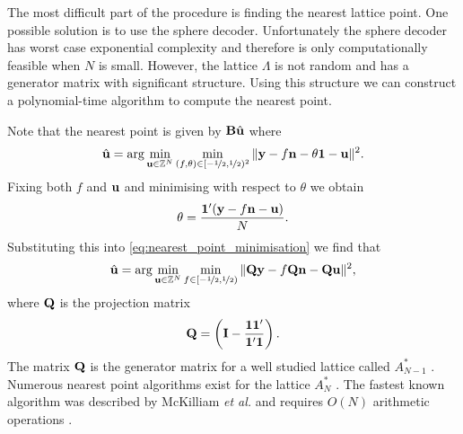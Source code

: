 The most difficult part of the procedure is finding the nearest lattice point.
One possible solution is to use the sphere decoder.  Unfortunately the sphere
decoder has worst case exponential complexity and therefore is only
computationally feasible when $N$ is small.  However, the lattice $\Lambda$ is
not random and has a generator matrix with significant structure.  Using this
structure we can construct a polynomial-time algorithm to compute the nearest
point.  %

Note that the nearest point is given by $\mathbf{B}\hat{\mathbf{u}}$ where
\begin{equation}\label{eq:nearest_point_minimisation}
\hat{\ubf} = \arg\min_{\ubf\in\ints^N}\min_{(f, \theta)\in[-\nicefrac{1}{2},\nicefrac{1}{2})^2} \|\ybf - f\nbf - \theta\onebf - \ubf\|^2 .
\end{equation}
Fixing both $f$ and $\mathbf{u}$ and minimising with respect to $\theta$ we obtain
\begin{equation} \label{eq:minwrttheta} 
\theta = \frac{\onebf'(\ybf - f\nbf - \ubf)}{N}.
\end{equation}
Substituting this into \eqref{eq:nearest_point_minimisation} we find that
\begin{equation} \label{eq:min_An*_line}
\hat{\ubf} = \arg\min_{\ubf\in\ints^N}\min_{f\in[-\nicefrac{1}{2},\nicefrac{1}{2})} \|\Qbf\ybf - f\Qbf\nbf - \Qbf\ubf\|^2 ,
\end{equation}
where $\mathbf{Q}$ is the projection matrix
\begin{equation} \label{eq:Q}
\Qbf =  \left(\Ibf - \frac{\onebf \onebf'}{\onebf'\onebf}\right).
\end{equation}
The matrix $\mathbf{Q}$ is the generator matrix for a well studied lattice called
$A_{N-1}^*$ \cite{SPLAG}.  Numerous nearest point algorithms exist for the
lattice $A_N^*$ \cite{Clarkson1999:Anstar, Conway1982FastQuantDec,
  McKilliam2008a, McKilliam2008b}.  The fastest known algorithm was described
by McKilliam \emph{et al.} and requires $O(N)$ arithmetic operations
\cite{McKilliam2008b}.

